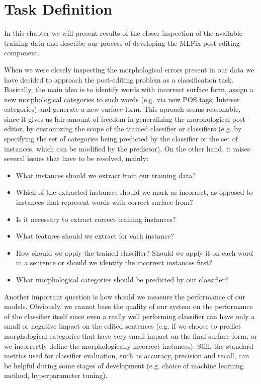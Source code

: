 \chapter{Task Definition}
\label{chap:task_descr}

In this chapter we will present results of the closer inspection
of the available training data and describe our process of developing
the MLFix post-editing component.


When we were closely inspecting the morphological errors present in our data we have decided
to approach the post-editing problem as a classification task. 
Basically, the main idea is to identify words with incorrect surface form,
assign a new morphological categories to such words (e.g. via new POS tags, Interset
categories) and generate a new surface form.
This aproach seems reasonable, since it gives us fair amount of freedom in generalizing the morphological
post-editor, by customizing the scope of the trained classifier or classifiers (e.g. by specifying the
set of categories being predicted by the classifier or the set of instances, which can be modified by the predictor).
On the other hand, it raises several issues that have to be resolved, mainly:
\begin{itemize}
    \item What instances should we extract from our training data?
    \item Which of the extracted instances should we mark as incorrect, as opposed
        to instances that represent words with correct surface from?
    \item Is it necessary to extract correct training instances?
    \item What features should we extract for each instance?
    \item How should we apply the trained classifier? Should we apply it
        on each word in a sentence or should we identify the incorrect instances
        first?
    \item What morphological categories should be predicted by our classifier?
\end{itemize}

Another important question is how should we measure the performance of our models.
Obviously, we cannot base the quality of our system on the performance of the
classifier itself since even a really well performing classifier can have only a small or negative
impact on the edited sentences (e.g. if we choose to predict morphological categories
that have very small impact on the final surface form, or we incorrectly define the morphologically incorrect
instances). Still, the standard metrics
used for classifier evaluation, such as accuracy, precision and recall, can be helpful
during some stages of development (e.g. choice of machine learning method, hyperparameter tuning).

